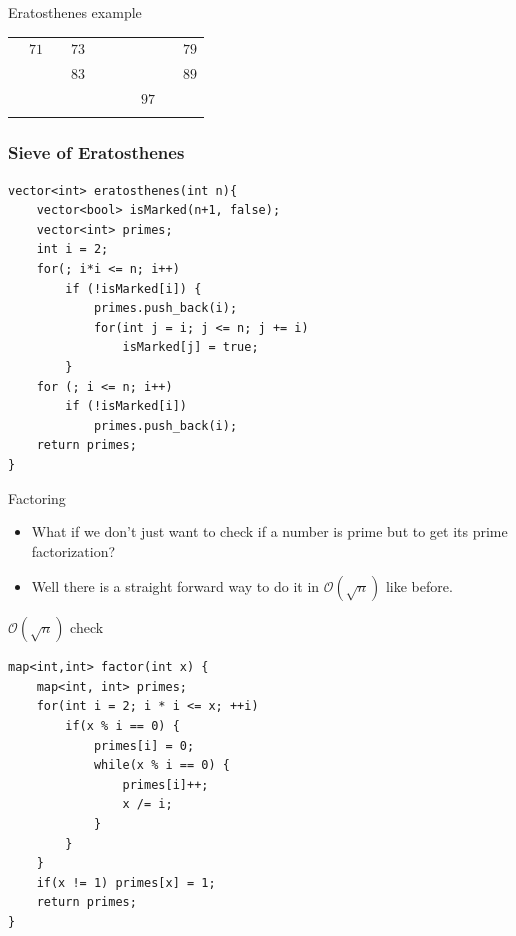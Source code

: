 \documentclass{beamer}
\begin{document}
\begin{frame}[plain]{Eratosthenes example}
{\begin{tabular}{r r r r r r r r r r}
			                   & \color{black} $71$ &                    & \color{black} $73$ &                    &                    &                    &                    &                    & \color{black} $79$\\
			                   &                    &                    & \color{black} $83$ &                    &                    &                    &                    &                    & \color{black} $89$\\
			                   &                    &                    &                    &                    &                    &                    & \color{black} $97$ &                    &                   \\
			\phantom{$888$} & \phantom{$888$} & \phantom{$888$} & \phantom{$888$} & \phantom{$888$} & \phantom{$888$} & \phantom{$888$} & \phantom{$888$} & \phantom{$888$} & \phantom{$888$}
        \end{tabular}
	}
\end{frame}

\begin{frame}
  \frametitle{Sieve of Eratosthenes}
      \begin{verbatim}
vector<int> eratosthenes(int n){
    vector<bool> isMarked(n+1, false);
    vector<int> primes;
    int i = 2;
    for(; i*i <= n; i++)
        if (!isMarked[i]) {
            primes.push_back(i);
            for(int j = i; j <= n; j += i)
                isMarked[j] = true;
        }
    for (; i <= n; i++)
        if (!isMarked[i])
            primes.push_back(i);
    return primes;
}
    \end{verbatim}
\end{frame}

\begin{frame}[plain]{Factoring}
  \begin{itemize}
    \item What if we don't just want to check if a number is prime but to get its prime factorization?
    
    \item<2-> Well there is a straight forward way to do it in $\mathcal{O}(\sqrt{n})$ like before.
  \end{itemize}
\end{frame}

\begin{frame}{$\mathcal{O}(\sqrt{n})$ check}
\begin{verbatim}
map<int,int> factor(int x) {
    map<int, int> primes;
    for(int i = 2; i * i <= x; ++i)
        if(x % i == 0) {
            primes[i] = 0;
            while(x % i == 0) {
                primes[i]++;
                x /= i;
            }
        }
    }
    if(x != 1) primes[x] = 1;
    return primes;
}
\end{verbatim}
\end{frame}
\end{document}
